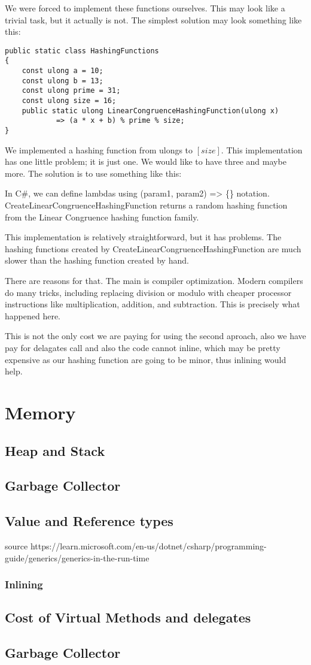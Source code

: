 We were forced to implement these functions ourselves. This may look like a trivial task, but it actually is not. The simplest solution may look something like this:
\begin{lstlisting}
public static class HashingFunctions
{
	const ulong a = 10;
	const ulong b = 13;
	const ulong prime = 31;
	const ulong size = 16;
	public static ulong LinearCongruenceHashingFunction(ulong x) 
            => (a * x + b) % prime % size;
}
\end{lstlisting}
We implemented a hashing function from ulongs to $[size]$. This implementation has one little problem; it is just one. We would like to have three and maybe more. The solution is to use something like this:




In C\#, we can define lambdas using (param1, param2) => \{\}  notation. 
CreateLinearCongruenceHashingFunction returns a random hashing function from the Linear Congruence hashing function family. 

This implementation is relatively straightforward, but it has problems. The hashing functions created by CreateLinearCongruenceHashingFunction are much slower than the hashing function created by hand. 

There are reasons for that. The main is compiler optimization. Modern compilers do many tricks, including replacing division or modulo with cheaper processor instructions like multiplication, addition, and subtraction. This is precisely what happened here.

This is not the only cost we are paying for using the second aproach, also we have pay for delagates call and also the code cannot inline, which may be pretty expensive as our hashing function are going to be minor, thus inlining would help.

\section{Memory}
\subsection{Heap and Stack}
\subsection{Garbage Collector}
\subsection{Value and Reference types}



source
https://learn.microsoft.com/en-us/dotnet/csharp/programming-guide/generics/generics-in-the-run-time



\subsubsection{Inlining}



\subsection{Cost of Virtual Methods and delegates}

\subsection{Garbage Collector}